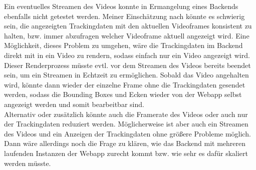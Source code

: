 Ein eventuelles Streamen des Videos konnte in Ermangelung eines Backends ebenfalls nicht getestet werden. Meiner Einschätzung nach könnte es schwierig sein, die angezeigten Trackingdaten mit den aktuellen Videoframes konsistent zu halten, bzw. immer abzufragen welcher Videoframe aktuell angezeigt wird. Eine Möglichkeit, dieses Problem zu umgehen, wäre die Trackingdaten im Backend direkt mit in ein Video zu rendern, sodass einfach nur ein Video angezeigt wird. Dieser Renderprozess müsste evtl. vor dem Streamen des Videos bereits beendet sein, um ein Streamen in Echtzeit zu ermöglichen. Sobald das Video angehalten wird, könnte dann wieder der einzelne Frame ohne die Trackingdaten gesendet werden, sodass die Bounding Boxes und Ecken wieder von der Webapp selbst angezeigt werden und somit bearbeitbar sind. \\
Alternativ oder zusätzlich könnte auch die Framerate des Videos oder auch nur der Trackingdaten reduziert werden. Möglicherweise ist aber auch ein Streamen des Videos und ein Anzeigen der Trackingdaten ohne größere Probleme möglich. Dann wäre allerdings noch die Frage zu klären, wie das Backend mit mehreren laufenden Instanzen der Webapp zurecht kommt bzw. wie sehr es dafür skaliert werden müsste.
